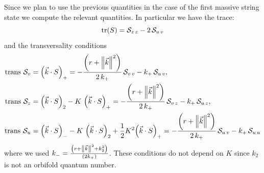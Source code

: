 Since we plan to use the previous quantities in the case of the first massive string state we compute the relevant quantities.
In particular we have the trace:
\begin{equation}
  \tr(S) = \mathcal{S}_{z\,z} - 2\, \mathcal{S}_{u\,v}
\end{equation}
and the transversality conditions
\begin{equation}
  \begin{split}
    \text{trans}~
    \mathcal{S}_{v}
    & =
    \qty(\vec{k} \cdot S)_{+}
    =    
    -\frac{\qty(r + \norm{\vec{k}}^2)}{2\, k_+}\,
    \mathcal{S}_{v\,v}
    -
    k_{+}\, \mathcal{S}_{u\,v},
    \\
    \text{trans}~
    \mathcal{S}_{z}
    & =
    \qty(\vec{k} \cdot S)_{2}
    -
    K~ \qty(\vec{k} \cdot S)_{+}
    =
    -\frac{\qty(r + \norm{\vec{k}}^2)}{2\, k_+}\,
    \mathcal{S}_{v\,z}
    -
    k_{+}\, \mathcal{S}_{u\,z},
    \\
    \text{trans}~
    \mathcal{S}_{u}
    & =
    \qty(\vec{k} \cdot S)_{-}
    -
    K~ \qty(\vec{k} \cdot S)_{2}
    +
    \frac{1}{2} K^2 \qty(\vec{k} \cdot S)_{+}
    =
    -\frac{\qty(r + \norm{\vec{k}}^2)}{2\, k_+}\,
    \mathcal{S}_{u\,v}
    -
    k_{+}\, \mathcal{S}_{u\,u}
  \end{split}
\end{equation}
where we used $k_- = \frac{\qty(r + \norm{\vec{k}}^2 + k_2^2)}{\qty(2 k_+)}$.
These conditions do not depend on $K$ since $k_2$ is not an orbifold quantum number.

